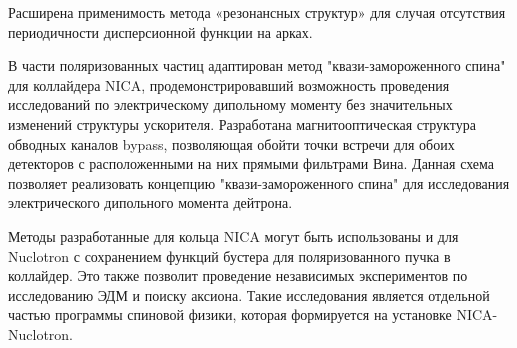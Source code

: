 \par Расширена применимость метода «резонансных структур» для случая отсутствия периодичности дисперсионной функции на арках.

\par В части поляризованных частиц адаптирован метод "квази-замороженного спина" для коллайдера NICA, продемонстрировавший возможность проведения исследований по электрическому дипольному моменту без значительных изменений структуры ускорителя. Разработана магнитооптическая структура обводных каналов bypass, позволяющая обойти точки встречи для обоих детекторов с расположенными на них прямыми фильтрами Вина. Данная схема позволяет реализовать концепцию "квази-замороженного спина" для исследования электрического дипольного момента дейтрона. 

\par Методы разработанные для кольца NICA могут быть использованы и для Nuclotron с сохранением функций бустера для поляризованного пучка в коллайдер. Это также позволит проведение независимых экспериментов по исследованию ЭДМ и поиску аксиона. Такие исследования является отдельной частью программы спиновой физики, которая формируется на уста­новке NICA-Nuclotron.

